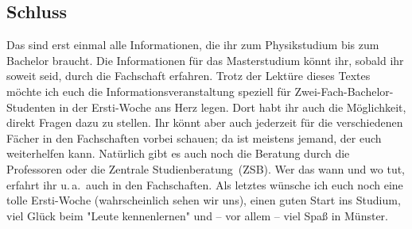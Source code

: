 \begin{multicols*}{2}
\subsection{Schluss}
Das sind erst einmal alle Informationen, die ihr zum Physikstudium bis zum Bachelor braucht.
Die Informationen für das Masterstudium könnt ihr, sobald ihr soweit seid, durch die Fachschaft erfahren.
Trotz der Lektüre dieses Textes möchte ich euch die Informationsveranstaltung speziell für Zwei-Fach-Bachelor-Studenten in der Ersti-Woche ans Herz legen.
Dort habt ihr auch die Möglichkeit, direkt Fragen dazu zu stellen.
Ihr könnt aber auch jederzeit für die verschiedenen Fächer in den Fachschaften vorbei schauen; da ist meistens jemand, der euch weiterhelfen kann.
Natürlich gibt es auch noch die Beratung durch die Professoren oder die Zentrale Studienberatung~(ZSB).
Wer das wann und wo tut, erfahrt ihr u.\,a.\ auch in den Fachschaften.
Als letztes wünsche ich euch noch eine tolle Ersti-Woche (wahrscheinlich sehen wir uns), einen guten Start ins Studium, viel Glück beim "Leute kennenlernen" und -- vor allem -- viel Spaß in Münster.


\begin{center}
\end{center}
\end{multicols*}
